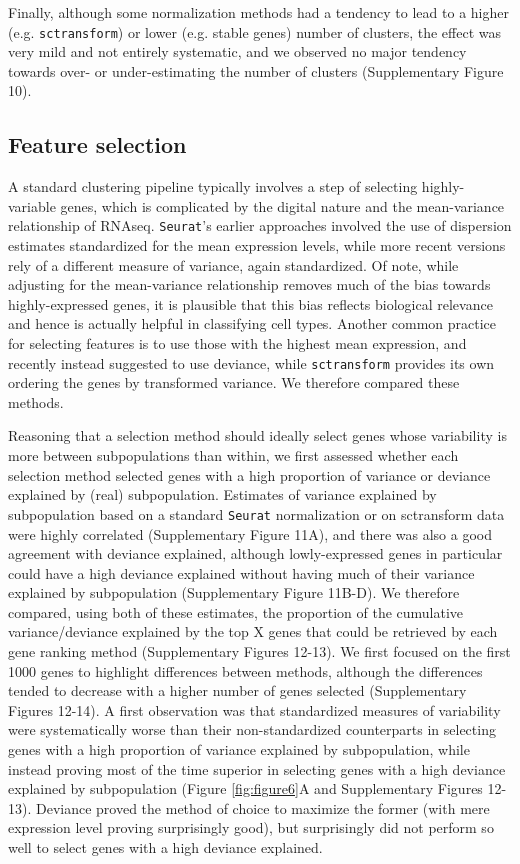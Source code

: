 \documentclass{bmcart}
\begin{document}
Finally, although some normalization methods had a tendency to lead to a higher (e.g. \texttt{sctransform}) or lower (e.g. stable genes) number of clusters, the effect was very mild and not entirely systematic, and we observed no major tendency towards over- or under-estimating the number of clusters (Supplementary Figure 10).

\subsection*{Feature selection}

A standard clustering pipeline typically involves a step of selecting highly-variable genes, which is complicated by the digital nature and the mean-variance relationship of RNAseq. \texttt{Seurat}'s earlier approaches involved the use of dispersion estimates standardized for the mean expression levels, while more recent versions rely of a different measure of variance, again standardized. Of note, while adjusting for the mean-variance relationship removes much of the bias towards highly-expressed genes, it is plausible that this bias reflects biological relevance and hence is actually helpful in classifying cell types. Another common practice for selecting features is to use those with the highest mean expression, and recently \citep{townesGlmpca2019} instead suggested to use deviance, while \texttt{sctransform} provides its own ordering the genes by transformed variance. We therefore compared these methods.

Reasoning that a selection method should ideally select genes whose variability is more between subpopulations than within, we first assessed whether each selection method selected genes with a high proportion of variance or deviance explained by (real) subpopulation. Estimates of variance explained by subpopulation based on a standard \texttt{Seurat} normalization or on sctransform data were highly correlated (Supplementary Figure 11A), and there was also a good agreement with deviance explained, although lowly-expressed genes in particular could have a high deviance explained without having much of their variance explained by subpopulation (Supplementary Figure 11B-D). We therefore compared, using both of these estimates, the proportion of the cumulative variance/deviance explained by the top X genes that could be retrieved by each gene ranking method (Supplementary Figures 12-13). We first focused on the first 1000 genes to highlight differences between methods, although the differences tended to decrease with a higher number of genes selected (Supplementary Figures 12-14). A first observation was that standardized measures of variability were systematically worse than their non-standardized  counterparts in selecting genes with a high proportion of variance explained by subpopulation, while instead proving most of the time superior in selecting genes with a high deviance explained by subpopulation (Figure \ref{fig:figure6}A and Supplementary Figures 12-13). Deviance proved the method of choice to maximize the former (with mere expression level proving surprisingly good), but surprisingly did not perform so well to select genes with a high deviance explained.
\end{document}

